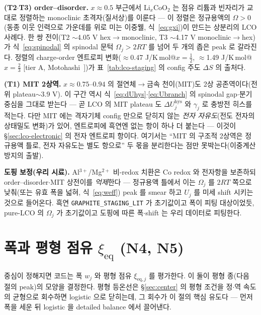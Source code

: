 \documentclass[11pt,a4paper]{article}
\newcommand{\eq}{\mathrm{eq}}
\newcommand{\hys}{\mathrm{hys}}
\newcommand{\code}[1]{\texttt{#1}}
\begin{document}
\textbf{(T2$\cdot$T3) order--disorder.} $x\approx0.5$ 부근에서 $\mathrm{Li}_x\mathrm{CoO_2}$ 는 점유 리튬과 빈자리가
교대로 정렬하는 monoclinic 초격자(질서상)를 이룬다 — 이 정렬은 정규용액의 $\Omega>0$(동종 이웃 인력으로 가운데를 위로
미는 이중웰, 식~\eqref{eq:gxi})이 만드는 상분리의 LCO 사례다. 한 쌍 전이(T2 $\sim$4.05 V hex$\to$monoclinic,
T3 $\sim$4.17 V monoclinic$\to$hex)가 식~\eqref{eq:spinodal} 의 spinodal 문턱 $\Omega_j>2RT$ 를 넘어 두 개의 좁은
peak 로 갈라진다. 정렬의 charge-order 엔트로피 변화($\approx$0.47 J/K\,mol@$x{=}\tfrac12$, $\approx$1.49 J/K\,mol@$x{=}\tfrac23$
[tier A, Motohashi~\cite{motohashi2009}])가 표~\ref{tab:lco-staging} 의 config 주도 $\Delta S$ 의 출처다.

\textbf{(T1) MIT 2상역.} $x\approx0.75$--$0.94$ 의 절연체$\to$금속 천이(MIT)도 2상 공존역이다(전위 plateau$\sim$3.9 V).
이 구간 역시 식~\eqref{eq:dUhys}$\cdot$\eqref{eq:Ubranch} 의 spinodal gap$\cdot$분기 중심을 그대로 받는다 — 곧 LCO 의
MIT plateau 도 $\Delta U_j^\hys$ 와 $\gamma_j$ 로 충방전 히스를 적는다. 다만 MIT 에는 격자기체 config 만으로 닫히지 않는
\emph{전자 자유도}(전도 전자의 상태밀도 변화)가 있어, 엔트로피에 흑연엔 없는 항이 하나 더 붙는다 — 이것이
\S\ref{sec:lco-electronic} 의 전자 엔트로피 항이다. 여기서는 ``MIT 의 구조적 2상역은 정규용액 틀로, 전자 자유도는 별도
항으로'' 두 몫을 분리한다는 점만 못박는다(이중계산 방지의 출발).

\textbf{도핑 보정(우리 시료).} Al$^{3+}$/Mg$^{2+}$ 비-redox 치환은 Co redox 와 전자항을 보존하되 order--disorder$\cdot$MIT
상전이를 \emph{억제}한다 — 정규용액 틀에서 이는 $\Omega_j$ 를 $2RT$ 쪽으로 낮춰(또는 유효 폭을 넓혀, 식~\eqref{eq:weff})
peak 를 smear 하고 $U_j$ 를 미세 shift 시키는 것으로 들어온다. 흑연 \code{GRAPHITE\_STAGING\_LIT} 가 초기값이고 폭이
피팅 대상이었듯, pure-LCO 의 $\Omega_j$ 가 초기값이고 도핑에 따른 폭$\cdot$shift 는 우리 데이터로 피팅한다.

\section{폭과 평형 점유 $\xi_\eq$ (N4, N5)}\label{sec:width}
중심이 정해지면 코드는 폭 $w_j$ 와 평형 점유 $\xi_{\eq,j}$ 를 평가한다. 이 둘이 평형 종(다음 절의 peak)의 모양을
결정한다. 평형 등온선은 \S\ref{sec:center} 의 평형 조건을 정$\cdot$역 속도의 균형으로 회수하면 logistic 으로 닫히는데,
그 회수가 이 절의 핵심 유도다 — 먼저 폭을 세운 뒤 logistic 을 detailed balance 에서 끌어낸다.
\end{document}
